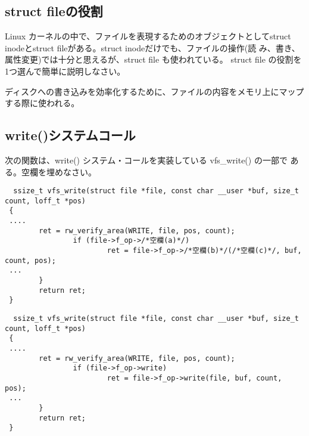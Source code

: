 \documentclass[a4j,9pt]{jsarticle}
\begin{document}
\subsection{struct fileの役割}
\begin{screen}
Linux カーネルの中で、ファイルを表現するためのオブジェクトとしてstruct
 inodeとstruct fileがある。struct inodeだけでも、ファイルの操作(読
 み、書き、属性変更)では十分と思えるが、struct file も使われている。
 struct file の役割を1つ選んで簡単に説明しなさい。
\end{screen}
ディスクへの書き込みを効率化するために、ファイルの内容をメモリ上にマップ
する際に使われる。

\subsection{write()システムコール}
\begin{screen}
 
 次の関数は、write() システム・コールを実装している vfs\_write() の一部で ある。空欄を埋めなさい。
\begin{lstlisting}
  ssize_t vfs_write(struct file *file, const char __user *buf, size_t count, loff_t *pos)
 {
 ....
        ret = rw_verify_area(WRITE, file, pos, count);
                if (file->f_op->/*空欄(a)*/)
                        ret = file->f_op->/*空欄(b)*/(/*空欄(c)*/, buf, count, pos);
 ...
        }
        return ret;
 }
\end{lstlisting}
\end{screen}
\newpage
\begin{lstlisting}
  ssize_t vfs_write(struct file *file, const char __user *buf, size_t count, loff_t *pos)
 {
 ....
        ret = rw_verify_area(WRITE, file, pos, count);
                if (file->f_op->write)
                        ret = file->f_op->write(file, buf, count, pos);
 ...
        }
        return ret;
 }
\end{lstlisting}
\end{document}
